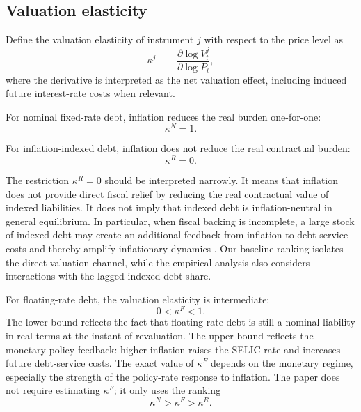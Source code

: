 \documentclass[12pt,a4paper]{article}
\begin{document}
\subsection{Valuation elasticity}

Define the valuation elasticity of instrument \(j\) with respect to the price level as
\begin{equation}
\kappa^j
\equiv
-\frac{\partial \log V_t^j}{\partial \log P_t},
\label{eq:kappa_def}
\end{equation}
where the derivative is interpreted as the net valuation effect, including induced future interest-rate costs when relevant.

For nominal fixed-rate debt, inflation reduces the real burden one-for-one:
\begin{equation}
\kappa^N=1.
\end{equation}

For inflation-indexed debt, inflation does not reduce the real contractual burden:
\begin{equation}
\kappa^R=0.
\end{equation}

The restriction \(\kappa^R=0\) should be interpreted narrowly. It means that inflation does not provide direct fiscal relief by reducing the real contractual value of indexed liabilities. It does not imply that indexed debt is inflation-neutral in general equilibrium. In particular, when fiscal backing is incomplete, a large stock of indexed debt may create an additional feedback from inflation to debt-service costs and thereby amplify inflationary dynamics \citep{Kawalec2025}. Our baseline ranking isolates the direct valuation channel, while the empirical analysis also considers interactions with the lagged indexed-debt share.


For floating-rate debt, the valuation elasticity is intermediate:
\begin{equation}
0<\kappa^F<1.
\end{equation}
The lower bound reflects the fact that floating-rate debt is still a nominal liability in real terms at the instant of revaluation. The upper bound reflects the monetary-policy feedback: higher inflation raises the SELIC rate and increases future debt-service costs. The exact value of \(\kappa^F\) depends on the monetary regime, especially the strength of the policy-rate response to inflation. The paper does not require estimating \(\kappa^F\); it only uses the ranking
\begin{equation}
\kappa^N>\kappa^F>\kappa^R.
\label{eq:kappa_ranking}
\end{equation}
\end{document}

